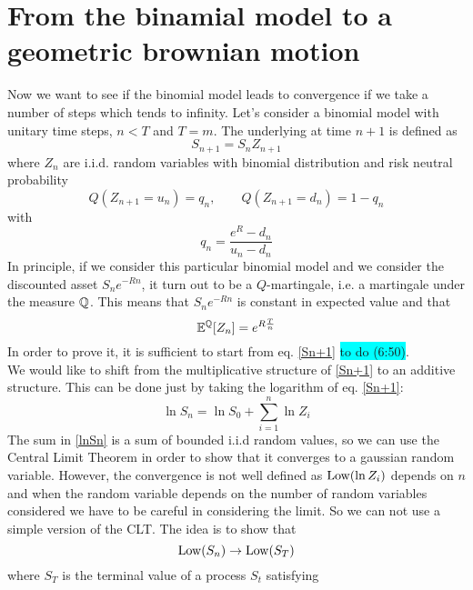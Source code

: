 \section[Convergence of the binomial model]{From the binamial model to a geometric brownian motion}
Now we want to see if the binomial model leads to convergence if we take a number of steps which tends to infinity. Let's consider a binomial model with unitary time steps, $n<T$ and $T=m$. The underlying at time $n+1$ is defined as
\begin{equation}\label{Sn+1}
    S_{n+1} = S_nZ_{n+1}
\end{equation}
where $Z_n$ are i.i.d. random variables with binomial distribution and risk neutral probability
\begin{equation}
    Q(Z_{n+1}=u_n)=q_n, \qquad Q(Z_{n+1}=d_n)=1-q_n
\end{equation}
with 
\begin{equation}
    q_n = \dfrac{e^R-d_n}{u_n-d_n}
\end{equation}
In principle, if we consider this particular binomial model and we consider the discounted asset $S_ne^{-Rn}$, it turn out to be a $Q$-martingale, i.e. a martingale under the measure ${\mathbb{Q}}$. This means that $S_ne^{-Rn}$ is constant in expected value and that
\begin{equation}
    \mathbb{E}^{\mathbb{Q}}[Z_n] = e^{R\frac{T}{n}}
\end{equation}
In order to prove it, it is sufficient to start from eq. \eqref{Sn+1} \colorbox{cyan}{to do (6:50)}.\\
We would like to shift from the multiplicative structure of \eqref{Sn+1} to an additive structure. This can be done just by taking the logarithm of eq. \eqref{Sn+1}:
\begin{equation}\label{lnSn}
    \ln S_n = \ln S_0 + \sum_{i=1}^n\ln Z_i
\end{equation}
The sum in \eqref{lnSn} is a sum of bounded i.i.d random values, so we can use the Central Limit Theorem in order to show that it converges to a gaussian random variable. However, the convergence is not well defined as $\operatorname{Low}(\ln Z_i)$ depends on $n$ and when the random variable depends on the number of random variables considered we have to be careful in considering the limit. So we can not use a simple version of the CLT. The idea is to show that 
\begin{equation}
    \operatorname{Low}(S_n)\to\operatorname{Low}(S_T)
\end{equation}
where $S_T$ is the terminal value of a process $S_t$ satisfying
